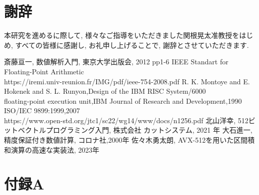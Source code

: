 \documentclass[11pt,a4paper]{jsreport}
\theoremstyle{definition}
\begin{document}
\chapter*{謝辞}
	本研究を進めるに際して, 様々なご指導をいただきました関根晃太准教授をはじめ, すべての皆様に感謝し, お礼申し上げることで, 謝辞とさせていただきます.


\vspace{-1mm}

{\footnotesize
    
}

\begin{thebibliography}{99}
 斎藤亘一, 数値解析入門, 東京大学出版会, 2012 pp1-6
 IEEE Standart for Floating-Point Arithmetic \\ https://iremi.univ-reunion.fr/IMG/pdf/ieee-754-2008.pdf
 R. K. Montoye and E. Hokenek and S. L. Runyon,Design of the IBM RISC System/6000 \\ floating-point execution unit,IBM Journal of Research and Development,1990
 ISO/IEC 9899:1999,2007 \\ https://www.open-std.org/jtc1/sc22/wg14/www/docs/n1256.pdf
 北山洋幸, 512ビットベクトルプログラミング入門, 株式会社 カットシステム, 2021 年
 大石進一, 精度保証付き数値計算, コロナ社,2000年
 佐々木勇太朗, AVX-512を用いた区間積和演算の高速な実装法, 2023年
  
\end{thebibliography}

\chapter*{付録A}
\end{document}
